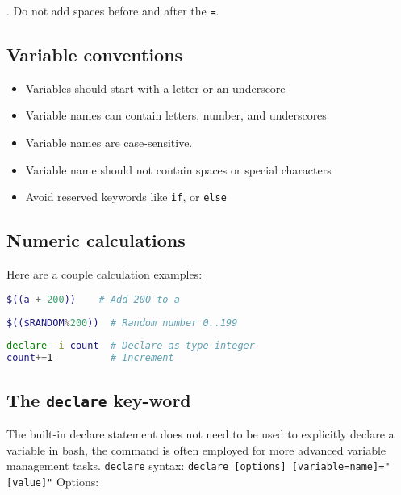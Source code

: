 \documentclass{article}
\newcommand{\inlinecode}[1]{\colorbox{backcolour}{\footnotesize{\texttt{#1}}}}
\begin{document}
\faWarning. Do not add spaces before and after the \inlinecode{=}.

\subsection{Variable conventions}

\begin{itemize}
	\item Variables should start with a letter or an underscore
	\item Variable names can contain letters, number, and underscores
	\item Variable names are case-sensitive.
	\item Variable name should not contain spaces or special characters
	\item Avoid reserved keywords like \inlinecode{if}, or \inlinecode{else}
\end{itemize}

\subsection{Numeric calculations}

Here are a couple calculation examples:

\begin{lstlisting}[style=command, language=bash]
$((a + 200))    # Add 200 to a
\end{lstlisting}

\begin{lstlisting}[style=command, language=bash]
$(($RANDOM%200))  # Random number 0..199
\end{lstlisting}

\begin{lstlisting}[style=command, language=bash]
declare -i count  # Declare as type integer
count+=1          # Increment
\end{lstlisting}

\subsection{The \inlinecode{declare} key-word}
The built-in declare statement does not need to be used to explicitly declare a variable in bash, the command is often employed for more advanced variable management tasks.
\inlinecode{declare} syntax: \inlinecode{declare [options] [variable=name]="[value]"}
Options:
\end{document}
